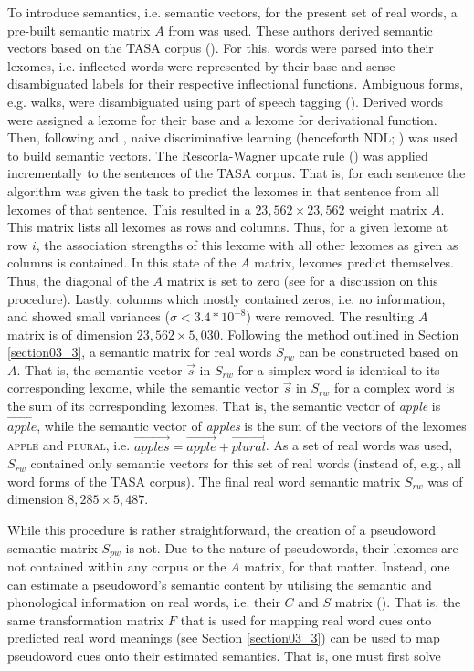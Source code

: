 To introduce semantics, i.e. semantic vectors, for the present set of real words, a pre-built semantic matrix $A$ from \citet{Baayen2019} was used. These authors derived semantic vectors based on the TASA corpus (\cite{Ivens1991}). For this, words were parsed into their lexomes, i.e. inflected words were represented by their base and sense-disambiguated labels for their respective inflectional functions. Ambiguous forms, e.g. walks, were disambiguated using part of speech tagging (\cite{Schmid1999}). Derived words were assigned a lexome for their base and a lexome for derivational function. Then, following \citet{Baayen2016} and \citet{Milin2017Feldman}, naive discriminative learning (henceforth NDL; \cite{Baayen2011, Sering2018}) was used to build semantic vectors. The Rescorla-Wagner update rule (\cite{Rescorla1972, Wagner1972, Rescorla1988}) was applied incrementally to the sentences of the TASA corpus. That is, for each sentence the algorithm was given the task to predict the lexomes in that sentence from all lexomes of that sentence. This resulted in a $23,562×23,562$ weight matrix $A$. This matrix lists all lexomes as rows and columns. Thus, for a given lexome at row $i$, the association strengths of this lexome with all other lexomes as given as columns is contained. In this state of the $A$ matrix, lexomes predict themselves. Thus, the diagonal of the $A$ matrix is set to zero (see \cite{Baayen2019} for a discussion on this procedure). Lastly, columns which mostly contained zeros, i.e. no information, and showed small variances ($σ<3.4*10^{-8}$) were removed. The resulting $A$ matrix is of dimension $23,562×5,030$. Following the method outlined in Section \ref{section03_3}, a semantic matrix for real words $S_{rw}$ can be constructed based on $A$. That is, the semantic vector $\overrightarrow{s}$ in $S_{rw}$ for a simplex word is identical to its corresponding lexome, while the semantic vector $\overrightarrow{s}$ in $S_{rw}$ for a complex word is the sum of its corresponding lexomes. That is, the semantic vector of \textit{apple} is $\overrightarrow{apple}$, while the semantic vector of \textit{apples} is the sum of the vectors of the lexomes \textsc{apple} and \textsc{plural}, i.e. $\overrightarrow{apples}=\overrightarrow{apple}+\overrightarrow{plural}$. As a set of real words was used, $S_{rw}$ contained only semantic vectors for this set of real words (instead of, e.g., all word forms of the TASA corpus). The final real word semantic matrix $S_{rw}$ was of dimension $8,285×5,487$.

While this procedure is rather straightforward, the creation of a pseudoword semantic matrix $S_{pw}$ is not. Due to the nature of pseudowords, their lexomes are not contained within any corpus or the $A$ matrix, for that matter. Instead, one can estimate a pseudoword’s semantic content by utilising the semantic and phonological information on real words, i.e. their $C$ and $S$ matrix (\cite{Chuang2021}). That is, the same transformation matrix $F$ that is used for mapping real word cues onto predicted real word meanings (see Section \ref{section03_3}) can be used to map pseudoword cues onto their estimated semantics. That is, one must first solve

